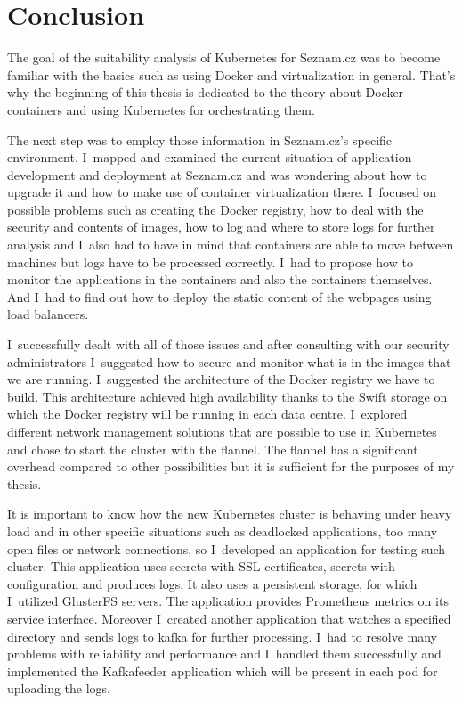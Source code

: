 \chapter{Conclusion}

The goal of the suitability analysis of Kubernetes for Seznam.cz was to become familiar with the basics such as using Docker and virtualization in general. That’s why the beginning of this thesis is dedicated to the theory about Docker containers and using Kubernetes for orchestrating them. 

The next step was to employ those information in Seznam.cz’s specific environment. I~mapped and examined the current situation of application development and deployment at Seznam.cz and was wondering about how to upgrade it and how to make use of container virtualization there. I~focused on possible problems such as creating the Docker registry, how to deal with the security and contents of images, how to log and where to store logs for further analysis and I~also had to have in mind that containers are able to move between machines but logs have to be processed correctly. I~had to propose how to monitor the applications in the containers and also the containers themselves. And I~had to find out how to deploy the static content of the webpages using load balancers.

I~successfully dealt with all of those issues and after consulting with our security administrators I~suggested how to secure and monitor what is in the images that we are running. I~suggested the architecture of the Docker registry we have to build. This architecture achieved high availability thanks to the Swift storage on which the Docker registry will be running in each data centre. I~explored different network management solutions that are possible to use in Kubernetes and chose to start the cluster with the flannel. The flannel has a significant overhead compared to other possibilities but it is sufficient for the purposes of my thesis.

It is important to know how the new Kubernetes cluster is behaving under heavy load and in other specific situations such as deadlocked applications, too many open files or network connections, so I~developed an application for testing such cluster. This application uses secrets with SSL certificates, secrets with configuration and produces logs. It also uses a persistent storage, for which I~utilized GlusterFS servers. The application provides Prometheus metrics on its service interface. Moreover I~created another application that watches a specified directory and sends logs to kafka for further processing. I~had to resolve many problems with reliability and performance and I~handled them successfully and implemented the Kafkafeeder application which will be present in each pod for uploading the logs.

